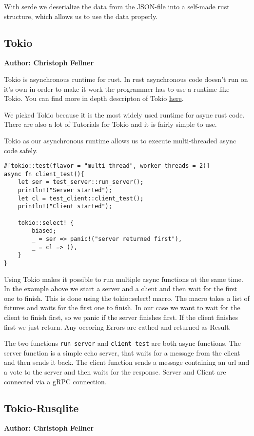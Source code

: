 With serde we deserialize the data from the JSON-file into a self-made rust structure, which allows us to use the data properly.  

\subsection{Tokio}
\textbf{Author: Christoph Fellner}

Tokio is asynchronous runtime for rust. In rust asynchronous code doesn't run on it's own in order to make it work the programmer has to use a runtime like Tokio. You can find more in depth descripton of Tokio \href{https://tokio.rs/tokio/tutorial}{here}. 

We picked Tokio because it is the most widely used runtime for async rust code. There are also a lot of Tutorials for Tokio and it is fairly simple to use.

Tokio as our asynchronous runtime allows us to execute multi-threaded async code safely.  

\begin{verbatim}
#[tokio::test(flavor = "multi_thread", worker_threads = 2)]
async fn client_test(){ 
    let ser = test_server::run_server();
    println!("Server started");
    let cl = test_client::client_test();
    println!("Client started");

    tokio::select! {
        biased; 
        _ = ser => panic!("server returned first"),
        _ = cl => (),
    }           
}
\end{verbatim}

Using Tokio makes it possible to run multiple async functions at the same time. In the example above we start a server and a client and then wait for the first one to finish. This is done using the tokio::select! macro. The macro takes a list of futures and waits for the first one to finish. In our case we want to wait for the client to finish first, so we panic if the server finishes first. If the client finishes first we just return. Any occoring Errors are cathed and returned as Result.

The two functions \verb+run_server+ and \verb+client_test+ are both async functions. The server function is a simple echo server, that waits for a message from the client and then sends it back. The client function sends a message containing an url and a vote to the server and then waits for the response. Server and Client are connected via a gRPC connection. 

\subsection{Tokio-Rusqlite}
\textbf{Author: Christoph Fellner}

